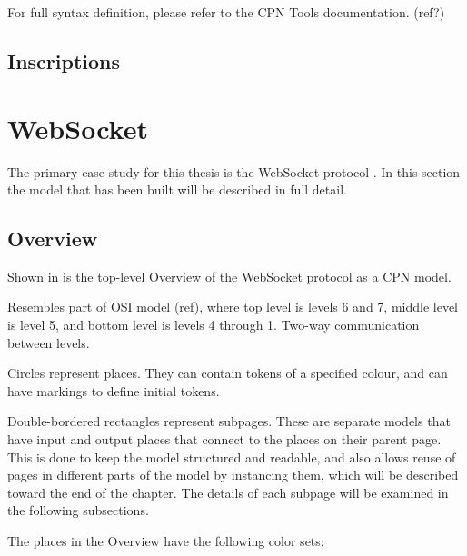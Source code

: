 		For full syntax definition, please refer to the CPN Tools
		documentation. (ref?)

\subsection{Inscriptions}

\section{WebSocket}

The primary case study for this thesis is the WebSocket
protocol \cite{draft-ietf-hybi-thewebsocketprotocol}. In this section the model
that has been built will be described in full detail.

\subsection{Overview}

	
	Shown in  is the top-level Overview of the WebSocket
	protocol as a CPN model.
	
	Resembles part of OSI model (ref), where top level is levels 6 and 7, middle
	level is level 5, and bottom level is levels 4 through 1. Two-way communication
	between levels.
	
	Circles represent places. They can contain tokens of a specified colour, and
	can have markings to define initial tokens.
	
	Double-bordered rectangles represent subpages. These are separate models that
	have input and output places that connect to the places on their parent page.
	This is done to keep the model structured and readable, and also allows reuse
	of pages in different parts of the model by instancing them, which will be
	described toward the end of the chapter. The details of each subpage will be
	examined in the following subsections.
	
	The places in the Overview have the following color sets:
	
